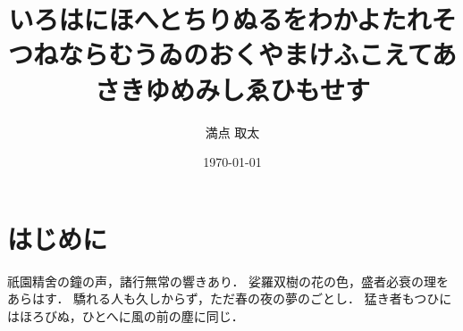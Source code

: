 \documentclass[zemi]{sty/penguin}
\begin{document}
\date{\today}
\title{いろはにほへとちりぬるをわかよたれそつねならむうゐのおくやまけふこえてあさきゆめみしゑひもせす}
\author{満点 取太}
\maketitle

\section{はじめに}
祇園精舍の鐘の声，諸行無常の響きあり．
娑羅双樹の花の色，盛者必衰の理をあらはす．
驕れる人も久しからず，ただ春の夜の夢のごとし．
猛き者もつひにはほろびぬ，ひとへに風の前の塵に同じ．



\end{document}
